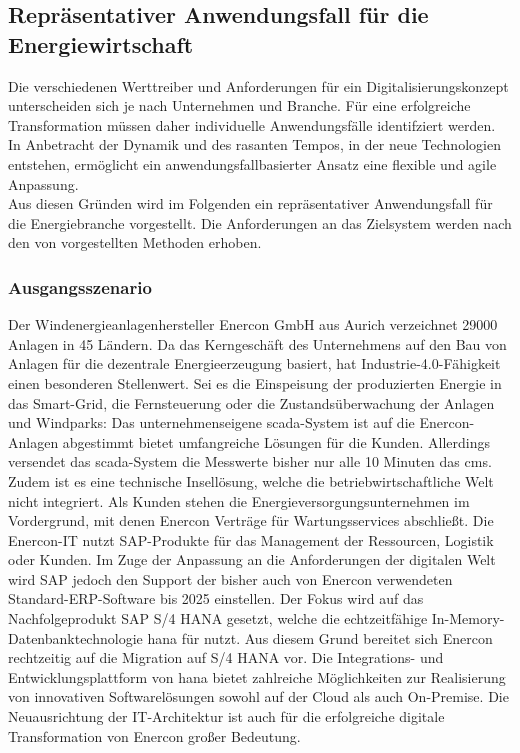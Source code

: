 \subsection{Repräsentativer Anwendungsfall für die Energiewirtschaft}\label{usecase}

Die verschiedenen Werttreiber und Anforderungen für ein Digitalisierungskonzept unterscheiden sich je nach Unternehmen und Branche.
Für eine erfolgreiche Transformation müssen daher individuelle Anwendungsfälle identifziert werden.
In Anbetracht der Dynamik und des rasanten Tempos, in der neue Technologien entstehen,
ermöglicht ein anwendungsfallbasierter Ansatz eine flexible und agile Anpassung. \citep[S. 31]{Acharya2019}
\\Aus diesen Gründen wird im Folgenden ein repräsentativer Anwendungsfall für die Energiebranche vorgestellt. Die Anforderungen an das Zielsystem werden nach den von \citet{Lauenroth2016} vorgestellten Methoden erhoben.

\subsubsection{Ausgangsszenario} \label{usecase}

Der Windenergieanlagenhersteller Enercon GmbH aus Aurich verzeichnet 29000 Anlagen in 45 Ländern. Da das Kerngeschäft des Unternehmens auf den Bau von Anlagen für die dezentrale Energieerzeugung basiert, hat Industrie-4.0-Fähigkeit einen besonderen Stellenwert. Sei es die Einspeisung der produzierten Energie in das Smart-Grid, die Fernsteuerung oder die Zustandsüberwachung der Anlagen und Windparks: Das unternehmenseigene \acf{scada}-System ist auf die Enercon-Anlagen abgestimmt bietet umfangreiche Lösungen für die Kunden. Allerdings versendet das \ac{scada}-System die Messwerte bisher nur alle 10 Minuten das \ac{cms}. Zudem ist es eine technische Insellösung, welche die betriebwirtschaftliche Welt nicht integriert. Als Kunden stehen die Energieversorgungsunternehmen im Vordergrund, mit denen Enercon Verträge für Wartungsservices abschließt. Die Enercon-IT nutzt SAP-Produkte für das Management der Ressourcen, Logistik oder Kunden. Im Zuge der Anpassung an die Anforderungen der digitalen Welt wird SAP jedoch den Support der bisher auch von Enercon verwendeten Standard-ERP-Software bis 2025 einstellen. Der Fokus wird auf das Nachfolgeprodukt SAP S/4 HANA gesetzt, welche die echtzeitfähige In-Memory-Datenbanktechnologie \acf{hana} für nutzt. Aus diesem Grund bereitet sich Enercon rechtzeitig auf die Migration auf S/4 HANA vor. Die Integrations- und Entwicklungsplattform von \ac{hana} bietet zahlreiche Möglichkeiten zur Realisierung von innovativen Softwarelösungen sowohl auf der Cloud als auch On-Premise. Die Neuausrichtung der IT-Architektur ist auch für die erfolgreiche digitale Transformation von Enercon großer Bedeutung.

